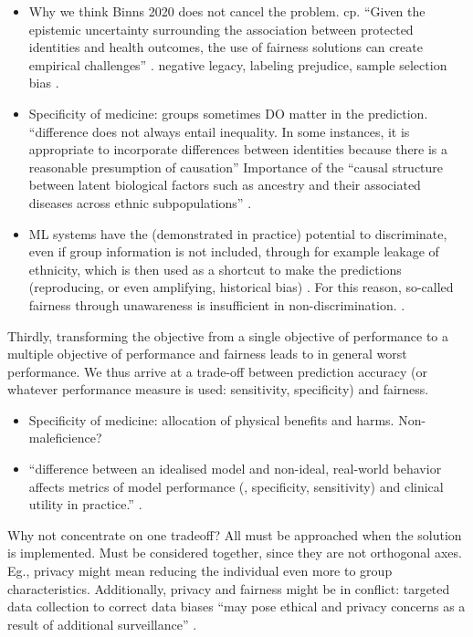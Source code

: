 {{        \begin{itemize}
            \item Why we think Binns 2020 does not cancel the problem.
                    cp. ``Given the epistemic uncertainty surrounding the association between protected identities and health outcomes, the use of fairness solutions can create empirical challenges'' \cite[e221]{Mccradden2020}.
                    negative legacy, labeling prejudice, sample selection bias \cite[p.~6]{Chen2021}.
            \item Specificity of medicine: groups sometimes DO matter in the prediction. ``difference does not always entail inequality. In some instances, it is appropriate to incorporate differences between identities because there is a reasonable presumption of causation'' \cite[e221]{Mccradden2020}
                    Importance of the ``causal structure between latent biological factors such as ancestry and their associated diseases across ethnic subpopulations'' \cite[p.~3]{Chen2021}.
            \item ML systems have the (demonstrated in practice) potential to discriminate, even if group information is not included, through for example leakage of ethnicity, which is then used as a shortcut to make the predictions (reproducing, or even amplifying, historical bias) \cite[p.~3]{Chen2021}.
                    For this reason, so-called fairness through unawareness is insufficient in non-discrimination. \cite[p.~5]{Chen2021}.
        \end{itemize}
    }
    Thirdly, transforming the objective from a single objective of performance to a multiple objective of performance and fairness leads to in general worst performance.
    We thus arrive at a trade-off between prediction accuracy (or whatever performance measure is used: sensitivity, specificity) and fairness.
    \begin{itemize}
        \item Specificity of medicine: allocation of physical benefits and harms. Non-maleficience?
        \item ``difference between an idealised model and non-ideal, real-world behavior affects metrics of model performance (\eg, specificity, sensitivity) and clinical utility in practice.'' \cite[e221]{Dijkstra2020}.
    \end{itemize}

    Why not concentrate on one tradeoff? All must be approached when the solution is implemented.
    Must be considered together, since they are not orthogonal axes. Eg., privacy might mean reducing the individual even more to group characteristics.
    Additionally, privacy and fairness might be in conflict: targeted data collection to correct data biases ``may pose ethical and privacy concerns as a result of additional surveillance'' \cite[p.~8]{Chen2021}.

}
